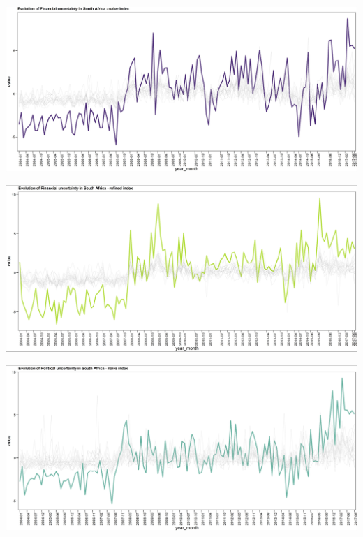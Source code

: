 \documentclass[11pt,preprint, authoryear]{elsarticle}
\let\origfigure\figure
\let\endorigfigure\endfigure
\renewenvironment{figure}[1][2] {
    \expandafter\origfigure\expandafter[H]
} {
    \endorigfigure
}
\numberwithin{equation}{section}
\numberwithin{figure}{section}
\numberwithin{table}{section}
\begin{document}
\begin{figure}
	\centering
	\includegraphics[width=\linewidth, keepaspectratio]{bin/financial_comp_naive}\\
	\caption{Composite Financial market uncertainty naive index. \label{fig_fin_comp_n}}
\end{figure}

\begin{figure}
	\centering
	\includegraphics[width=\linewidth, keepaspectratio]{bin/financial_comp_refine}\\
	\caption{Composite Financial market uncertainty refined index. \label{fig_fin_comp_r}}
\end{figure}

\begin{figure}
	\centering
	\includegraphics[width=\linewidth, keepaspectratio]{bin/pol_comp_naive}\\
	\caption{Composite Political uncertainty naive index. \label{fig_pol_comp_n}}
\end{figure}
\end{document}
